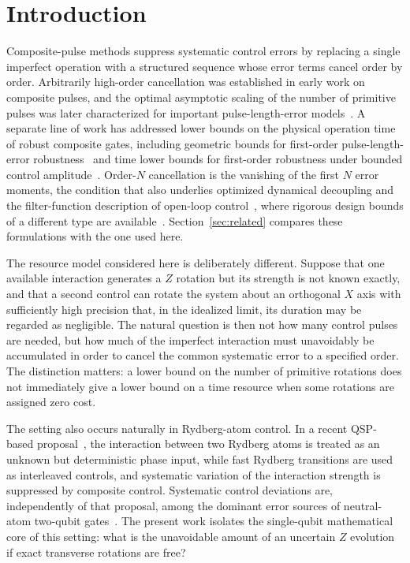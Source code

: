 \documentclass[%
  aps,
  pra,
  preprint,
  superscriptaddress,
  amsmath,amssymb,
  nofootinbib,
  floatfix,
]{revtex4-2}
\theoremstyle{definition}
\theoremstyle{remark}
\begin{document}
\section{Introduction}
\label{sec:intro}

Composite-pulse methods suppress systematic control errors by replacing a single imperfect
operation with a structured sequence whose error terms cancel order by order. Arbitrarily
high-order cancellation was established in early work on composite pulses, and the optimal
asymptotic scaling of the number of primitive pulses was later characterized for important
pulse-length-error models~\cite{Brown2004,Merrill2014,Low2014}. A separate line of work has
addressed lower bounds on the physical operation time of robust composite gates, including
geometric bounds for first-order pulse-length-error robustness~\cite{Kukita2023} and time
lower bounds for first-order robustness under bounded control amplitude~\cite{Zeng2025,Kosut2025}.
Order-$N$ cancellation is the vanishing of the first $N$ error moments, the condition that
also underlies optimized dynamical decoupling and the filter-function description of
open-loop control~\cite{Kabytayev2014,Uhrig2007,PazSilva2014}, where rigorous design bounds
of a different type are available~\cite{UhrigLidar2010,Khodjasteh2011,NgLidarPreskill2011}.
Section~\ref{sec:related} compares these formulations with the one used here.

The resource model considered here is deliberately different. Suppose that one available
interaction generates a $Z$ rotation but its strength is not known exactly, and that a second
control can rotate the system about an orthogonal $X$ axis with sufficiently high precision
that, in the idealized limit, its duration may be regarded as negligible. The natural
question is then not how many control pulses are needed, but how much of the imperfect
interaction must unavoidably be accumulated in order to cancel the common systematic error to
a specified order. The distinction matters: a lower bound on the number of primitive
rotations does not immediately give a lower bound on a time resource when some rotations are
assigned zero cost.

The setting also occurs naturally in Rydberg-atom control. In a recent QSP-based
proposal~\cite{Ye2026}, the interaction between two Rydberg atoms is treated as an unknown but
deterministic phase input, while fast Rydberg transitions are used as interleaved controls,
and systematic variation of the interaction strength is suppressed by composite control.
Systematic control deviations are, independently of that proposal, among the dominant error
sources of neutral-atom two-qubit gates~\cite{Evered2023,Mohan2023}. The present work isolates
the single-qubit mathematical core of this setting: what is the unavoidable amount of an
uncertain $Z$ evolution if exact transverse rotations are free?
\end{document}
